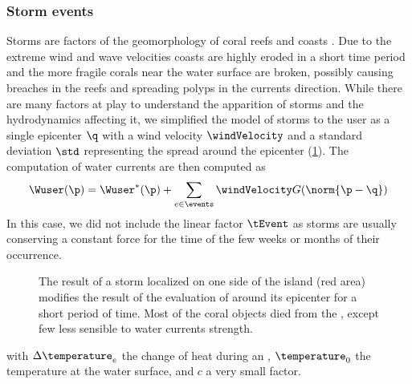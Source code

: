 \subsubsection{Storm events}
Storms are factors of the geomorphology of coral reefs \cite{VilaConcejo2016, Oron2023} and coasts \cite{Dominguez2005, Cowart2010}. Due to the extreme wind and wave velocities coasts are highly eroded in a short time period and the more fragile corals near the water surface are broken, possibly causing breaches in the reefs and spreading polyps in the currents direction. While there are many factors at play to understand the apparition of storms and the hydrodynamics affecting it, we simplified the model of storms to the user as a single epicenter $\q$ with a wind velocity $\windVelocity$ and a standard deviation $\std$ representing the spread around the epicenter (\cref{fig:env-obj-storm-event}). The computation of water currents are then computed as 
\begin{align*}
    \Wuser(\p) = \Wuser^*(\p) + \sum_{e \in \events} {\windVelocity G(\norm{\p - \q})}
\end{align*}
In this case, we did not include the linear factor $\tEvent$ as storms are usually conserving a constant force for the time of the few weeks or months of their occurrence. 

\begin{figure}
    \caption{The result of a storm localized on one side of the island (red area) modifies the result of the evaluation of  around its epicenter for a short period of time. Most of the coral objects died from the , except few  less sensible to water currents strength. }
    \label{fig:env-obj-storm-event}
\end{figure}

with $\Delta \temperature_e$ the change of heat during an , $\temperature_0$ the temperature at the water surface, and $c$ a very small factor.

